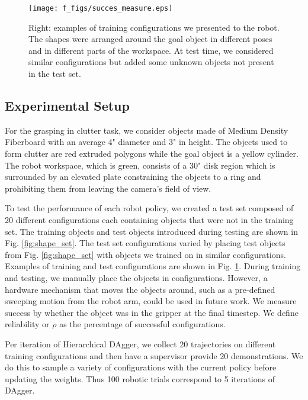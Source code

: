 \documentclass[10pt, conference]{ieeeconf}      %
\begin{document}
\begin{figure}[t]
\centering
\texttt{[image: f\_figs/succes\_measure.eps]}

\caption{\footnotesize  Right: examples of training configurations we presented to the robot. The shapes were arranged
around the goal object in different poses and in different parts of the workspace. At test time, we considered similar configurations but 
added some unknown objects not present in the test set. }
\vspace*{-20pt}
\label{fig:suc_meas}
\end{figure}

\subsection{Experimental Setup}
For the grasping in clutter task, we consider objects made of Medium Density Fiberboard with an average 4" diameter and 3" in height. The objects used to form clutter are red extruded polygons while the goal object is a yellow cylinder.  The robot workspace, which is green, consists of a  30" disk region which is
surrounded by an elevated plate constraining the objects to a ring and prohibiting them from leaving the camera's field of view. 


To test the performance of each robot policy, we created a test set composed of 20 different configurations each containing
objects that were not in the training set.  The training objects and test
objects introduced during testing are shown in Fig. \ref{fig:shape_set}. The test set configurations varied by placing
test objects from Fig. \ref{fig:shape_set} with objects we trained on in similar configurations. Examples of training and test configurations are shown in Fig. \ref{fig:suc_meas}.  During training and testing, we manually place the objects in configurations. However, a hardware mechanism that moves the objects around, such as a pre-defined sweeping motion from the robot arm, could be used in future work. We measure success by whether the object was in the gripper at the final timestep. We define reliability or $\rho$ as the percentage of successful configurations.

Per iteration of Hierarchical DAgger, we collect 20 trajectories on different training configurations and then have a supervisor provide 20 demonstrations. We do this to sample a variety of configurations with the current policy before updating the weights. Thus 100 robotic trials correspond to 5 iterations of DAgger.
\end{document}
